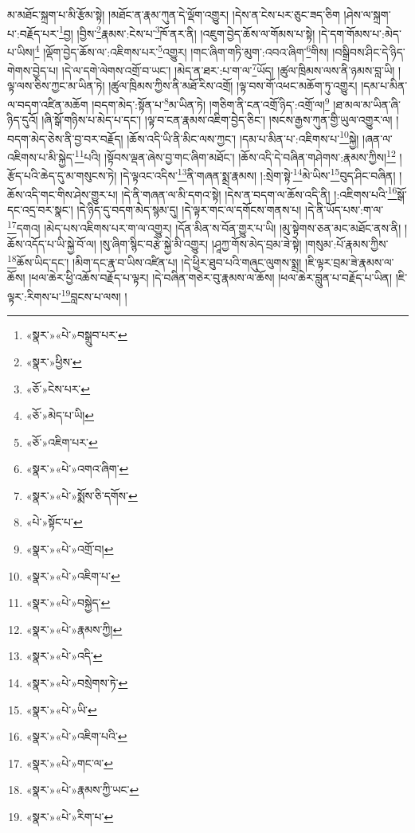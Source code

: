 མ་མཐོང་སྐྲག་པ་མི་རྩོམ་སྟེ། །མཐོང་ན་རྣམ་ཀུན་དེ་ལྡོག་འགྱུར། །དེས་ན་ངེས་པར་ཅུང་ཟད་ཅིག །ཤེས་ལ་སྐྲག་པ་:བརྗོད་པར་\footnote{«སྣར་»«པེ་»བསྒྲུབ་པར་}བྱ། །བྱིས་\footnote{«སྣར་»ཕྱིས་}རྣམས་:ངེས་པ་\footnote{«ཅོ་»ངེས་པར་}ཁོ་ནར་ནི། །འཇུག་བྱེད་ཆོས་ལ་གོམས་པ་སྟེ། །དེ་དག་གོམས་པ་:མེད་པ་ཡིས།\footnote{«ཅོ་»མེད་པ་ཡི།} །ལྡོག་བྱེད་ཆོས་ལ་:འཇིགས་པར་\footnote{«ཅོ་»འཇིག་པར་}འགྱུར། །གང་ཞིག་གཏི་མུག་:འབའ་ཞིག་\footnote{«སྣར་»«པེ་»འགའ་ཞིག་}གིས། །བསྒྲིབས་ཤིང་དེ་ཉིད་གེགས་བྱེད་པ། །དེ་ལ་དགེ་ལེགས་འགྲོ་བ་ཡང་། །མེད་ན་ཐར་:པ་ག་ལ་\footnote{«སྣར་»«པེ་»སྨོས་ཅི་དགོས་}ཡོད། །ཚུལ་ཁྲིམས་ལས་ནི་ཉམས་བླ་ཡི། །ལྟ་ལས་ཅིས་ཀྱང་མ་ཡིན་ཏེ། །ཚུལ་ཁྲིམས་ཀྱིས་ནི་མཐོ་རིས་འགྲོ། །ལྟ་བས་གོ་འཕང་མཆོག་ཏུ་འགྱུར། །དམ་པ་མིན་ལ་བདག་འཛིན་མཆོག །བདག་མེད་:སྟོན་པ་\footnote{«པེ་»སྟོང་པ་}མ་ཡིན་ཏེ། །གཅིག་ནི་ངན་འགྲོ་ཉིད་:འགྲོ་ལ།\footnote{«སྣར་»«པེ་»འགྲོ་བ།} །ཐ་མལ་མ་ཡིན་ཞི་ཉིད་དུའོ། །ཞི་སྒོ་གཉིས་པ་མེད་པ་དང་། །ལྟ་བ་ངན་རྣམས་འཇིག་བྱེད་ཅིང་། །སངས་རྒྱས་ཀུན་གྱི་ཡུལ་འགྱུར་ལ། །བདག་མེད་ཅེས་ནི་བྱ་བར་བརྗོད། །ཆོས་འདི་ཡི་ནི་མིང་ལས་ཀྱང་། །དམ་པ་མིན་པ་:འཇིགས་པ་\footnote{«སྣར་»«པེ་»འཇིག་པ་}སྐྱེ། །ཞན་ལ་འཇིགས་པ་མི་སྐྱེད་\footnote{«སྣར་»«པེ་»བསྐྱེད་}པའི། །སྟོབས་ལྡན་ཞེས་བྱ་གང་ཞིག་མཐོང་། །ཆོས་འདི་དེ་བཞིན་གཤེགས་:རྣམས་ཀྱིས།\footnote{«སྣར་»«པེ་»རྣམས་ཀྱི།} །རྩོད་པའི་ཆེད་དུ་མ་གསུངས་ཏེ། །དེ་ལྟའང་འདིས་\footnote{«སྣར་»«པེ་»འདི་}ནི་གཞན་སྨྲ་རྣམས། །:སྲེག་སྟེ་\footnote{«སྣར་»«པེ་»བསྲེགས་ཏེ་}མེ་ཡིས་\footnote{«སྣར་»«པེ་»ཡི་}བུད་ཤིང་བཞིན། །ཆོས་འདི་གང་གིས་ཤེས་གྱུར་པ། །དེ་ནི་གཞན་ལ་མི་དགའ་སྟེ། །དེས་ན་བདག་ལ་ཆོས་འདི་ནི། །:འཇིགས་པའི་\footnote{«སྣར་»«པེ་»འཇིག་པའི་}སྒོ་དང་འདྲ་བར་སྣང་། །དེ་ཉིད་དུ་བདག་མེད་སྙམ་དུ། །དེ་ལྟར་གང་ལ་དགོངས་གནས་པ། །དེ་ནི་ཡོད་པས་:ག་ལ་\footnote{«སྣར་»«པེ་»གང་ལ་}དགའ། །མེད་པས་འཇིགས་པར་ག་ལ་འགྱུར། །དོན་མིན་ས་བོན་གྱུར་པ་ཡི། །མུ་སྟེགས་ཅན་མང་མཐོང་ནས་ནི། །ཆོས་འདོད་པ་ཡི་སྐྱེ་བོ་ལ། །སུ་ཞིག་སྙིང་བརྩེ་སྐྱེ་མི་འགྱུར། །ཤཱཀྱ་གོས་མེད་བྲམ་ཟེ་སྟེ། །གསུམ་:པོ་རྣམས་ཀྱིས་\footnote{«སྣར་»«པེ་»རྣམས་ཀྱི་ཡང་}ཆོས་ཡིད་དང་། །མིག་དང་རྣ་བ་ཡིས་འཛིན་པ། །དེ་ཕྱིར་ཐུབ་པའི་གཞུང་ལུགས་སྨྲ། །ཇི་ལྟར་བྲམ་ཟེ་རྣམས་ལ་ཆོས། །ཕལ་ཆེར་ཕྱི་འཆོས་བརྗོད་པ་ལྟར། །དེ་བཞིན་གཅེར་བུ་རྣམས་ལ་ཆོས། །ཕལ་ཆེར་བླུན་པ་བརྗོད་པ་ཡིན། །ཇི་ལྟར་:རིགས་པ་\footnote{«སྣར་»«པེ་»རིག་པ་}བླངས་པ་ལས། །
